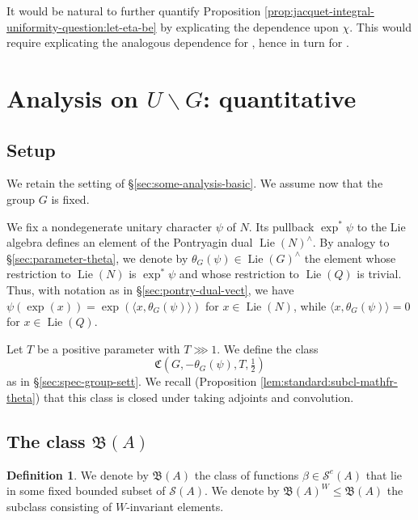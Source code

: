 \documentclass[reqno]{amsart}
\DeclareMathOperator{\Lie}{Lie}
\theoremstyle{plain} \newtheorem{theorem} {Theorem}
\theoremstyle{definition} \newtheorem{definition} [theorem] {Definition}
\theoremstyle{itplain} %
\numberwithin{equation}{section}
\numberwithin{theorem}{section}
\renewcommand{\leq}{\leqslant}
\begin{document}
\begin{remark}\label{rmk:standard2:jacquet-analytic-refine}
  It would be natural to further quantify Proposition \ref{prop:jacquet-integral-uniformity-question:let-eta-be} by explicating the dependence upon $\chi$.  This would require explicating the analogous dependence for \cite[Cor 2]{MR2402686}, hence in turn for \cite[\S10.1.11]{MR1170566}.
\end{remark}


\section{Analysis on $U \backslash G$: quantitative}

\subsection{Setup}\label{sec:analysis-U-G-quantitative-setup}
We retain the setting of \S\ref{sec:some-analysis-basic}.  We assume now that the group $G$ is fixed.

We fix a nondegenerate unitary character $\psi$ of $N$.  Its pullback $\exp^* \psi$ to the Lie algebra defines an element of the Pontryagin dual $\Lie(N)^\wedge$.  By analogy to \S\ref{sec:parameter-theta}, we denote by $\theta_G(\psi) \in \Lie(G)^\wedge$ the element whose restriction to $\Lie(N)$ is $\exp^*\psi$ and whose restriction to $\Lie(Q)$ is trivial.  Thus, with notation as in \S\ref{sec:pontry-dual-vect}, we have $\psi(\exp(x)) = \exp (\langle x, \theta_G(\psi)  \rangle)$ for $x \in \Lie(N)$, while $\langle x, \theta_G(\psi) \rangle = 0$ for $x \in \Lie(Q)$.

Let $T$ be a positive parameter with $T \ggg 1$.  We define the class
\begin{equation*}
\mathfrak{C}(G,-\theta_G(\psi),T,\tfrac{1}{2})
\end{equation*}
as in \S\ref{sec:spec-group-sett}.  We recall (Proposition \ref{lem:standard:subcl-mathfr-theta}) that this class is closed under taking adjoints and convolution.



\subsection{The class $\mathfrak{B}(A)$}\label{sec:class-mathfrakba}

\begin{definition}
  We denote by $\mathfrak{B}(A)$  the class of functions $\beta \in \mathcal{S}^e(A)$ that lie in some fixed bounded subset of $\mathcal{S}(A)$.  We denote by $\mathfrak{B}(A)^W \leq \mathfrak{B}(A)$ the subclass consisting of $W$-invariant elements.
\end{definition}
\end{document}
